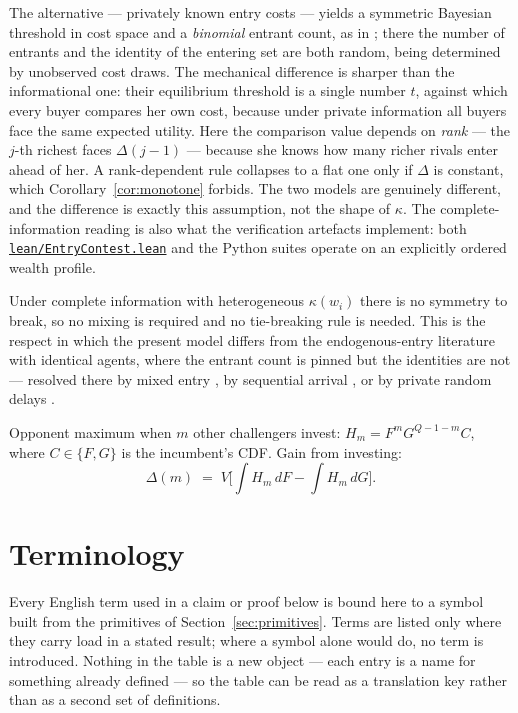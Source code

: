 \documentclass[11pt]{article}
\newcommand{\file}[1]{\href{run:#1}{\texttt{#1}}}
\begin{document}
The alternative --- privately known entry costs --- yields a symmetric
Bayesian threshold in cost space and a \emph{binomial} entrant count, as in
\citet{MorenoWooders2011}; there the number of entrants and the identity of the
entering set are both random, being determined by unobserved cost draws. The
mechanical difference is sharper than the informational one: their equilibrium
threshold is a single number $t$, against which every buyer compares her own
cost, because under private information all buyers face the same expected
utility. Here the comparison value depends on \emph{rank} --- the $j$-th
richest faces $\Delta(j-1)$ --- because she knows how many richer rivals enter
ahead of her. A rank-dependent rule collapses to a flat one only if $\Delta$ is
constant, which Corollary~\ref{cor:monotone} forbids. The two models are genuinely different, and
the difference is exactly this assumption, not the shape of $\kappa$. The
complete-information reading is also what the verification artefacts
implement: both \file{lean/EntryContest.lean} and the Python suites operate
on an explicitly ordered wealth profile.

Under complete information with heterogeneous $\kappa(w_i)$ there is no
symmetry to break, so no mixing is required and no tie-breaking rule is
needed. This is the respect in which the present model differs from the
endogenous-entry literature with identical agents, where the entrant count
is pinned but the identities are not --- resolved there by mixed entry
\citep{LevinSmith1994}, by sequential arrival \citep{FuLu2010}, or by
private random delays \citep{MorganOrzenSefton2012}.

Opponent maximum when $m$ other challengers invest:
$H_m = F^m G^{Q-1-m} C$, where $C\in\{F,G\}$ is the incumbent's CDF.
Gain from investing:
\[
  \Delta(m) \;=\; V\Big[\textstyle\int H_m\,dF - \int H_m\,dG\Big].
\]

\section{Terminology}
\label{sec:terminology}

Every English term used in a claim or proof below is bound here to a symbol
built from the primitives of Section~\ref{sec:primitives}. Terms are listed
only where they carry load in a stated result; where a symbol alone would do,
no term is introduced. Nothing in the table is a new object --- each entry is
a name for something already defined --- so the table can be read as a
translation key rather than as a second set of definitions.
\end{document}
